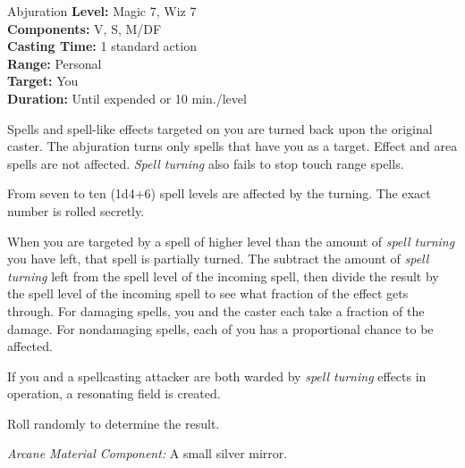 {Abjuration}
{
	\textbf{Level:}
	Magic 7, Wiz 7\\
	\textbf{Components:}
	V, S, M/DF\\
	\textbf{Casting Time:}
	1 standard action\\
	\textbf{Range:}
	Personal\\
	\textbf{Target:}
	You\\
	\textbf{Duration:}
	Until expended or 10 min./level\\
}
{
	Spells and spell-like effects targeted on you are turned back upon the original caster. The abjuration turns only spells that have you as a target. Effect and area spells are not affected. \emph{Spell turning} also fails to stop touch range spells.

	From seven to ten (1d4+6) spell levels are affected by the turning. The exact number is rolled secretly.

	When you are targeted by a spell of higher level than the amount of \emph{spell turning} you have left, that spell is partially turned. The subtract the amount of \emph{spell turning} left from the spell level of the incoming spell, then divide the result by the spell level of the incoming spell to see what fraction of the effect gets through. For damaging spells, you and the caster each take a fraction of the damage. For nondamaging spells, each of you has a proportional chance to be affected.

	If you and a spellcasting attacker are both warded by \emph{spell turning} effects in operation, a resonating field is created.

	Roll randomly to determine the result.


	\textit{Arcane Material Component:}
	A small silver mirror.

}
